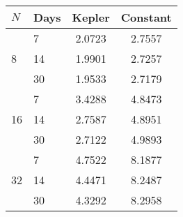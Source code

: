\begin{tabular}{l|lcc}
\hline
$N$ & Days & Kepler & Constant \\
\hline
\multirow{3}{*}{8} & 7 & 2.0723 & 2.7557 \\ 
                   & 14 & 1.9901 & 2.7257 \\ 
                   & 30 & 1.9533 & 2.7179 \\ \hline
\multirow{3}{*}{16}& 7 & 3.4288 & 4.8473 \\ 
                   & 14 & 2.7587 & 4.8951 \\ 
                   & 30 & 2.7122 & 4.9893 \\ \hline
\multirow{3}{*}{32}& 7 & 4.7522 & 8.1877 \\ 
                   & 14 & 4.4471 & 8.2487 \\ 
                   & 30 & 4.3292 & 8.2958 \\ \hline
\end{tabular}